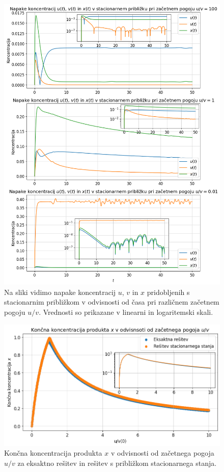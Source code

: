 \documentclass[slovene,11pt,a4paper]{article}
\begin{document}
\begin{figure}[h!]
\centering
\includegraphics[width=15cm]{bromid3.png}
\caption{Na sliki vidimo napake koncentracij $u$, $v$ in $x$ pridobljenih s stacionarnim približkom v odvisnosti od časa pri različnem začetnem pogoju $u/v$. Vrednosti so prikazane v linearni in logaritemski skali.}
\end{figure}

\newpage

\begin{figure}[h!]
\centering
\includegraphics[width=15cm]{bromid4.png}
\caption{Končna koncentracija produkta $x$ v odvisnosti od začetnega pogoja $u/v$ za eksaktno rešitev in rešitev s približkom stacionarnega stanja.}
\end{figure}
\end{document}
